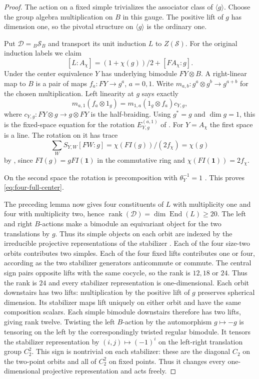 \documentclass[11pt,reqno]{amsart}
\theoremstyle{remark}\newtheorem{remark}[theorem]{Remark}
\numberwithin{equation}{section}
\begin{document}
\begin{proof}
The action on a fixed simple trivializes the associator class of
$\langle g\rangle$. Choose the group algebra multiplication on
$B$ in this gauge. The positive lift of $g$ has dimension one,
so the pivotal structure on $\langle g\rangle$ is the ordinary one.

Put $\mathcal D={}_B\mathcal S_B$ and transport its unit induction
$L$ to $Z(\mathcal S)$. For the original induction labels we claim
\begin{equation}\label{eq:four-full-center}
 [L:A_\chi]=(1+\chi(g))/2+[FA_\chi:g].
\end{equation}
Under the center equivalence $Y$ has underlying bimodule $FY\otimes B$.
A right-linear map to $B$ is a pair of maps $f_a:FY\to g^a$, $a=0,1$.
Write $m_{a,b}:g^a\otimes g^b\to g^{a+b}$ for the chosen multiplication.
Left linearity at $g$ says exactly
\[
 m_{a,1}(f_a\otimes1_g)=m_{1,a}(1_g\otimes f_a)c_{Y,g},
\]
where $c_{Y,g}:FY\otimes g\to g\otimes FY$ is the half-braiding.
Using $g^*=g$ and $\dim g=1$, this is the fixed-space equation
for the rotation $E^{(a,1)}_{Y,g}$ of \cite[Definition~2.4]{NgSchInd}.
For $Y=A_\chi$ the first space is a line. The rotation on it has trace
\[
 \sum_W S_{Y,W}[FW:g]=\chi(FI(g))/(2f_\chi)=\chi(g)
\]
by \cite[(5.4)]{NgSchInd}, since $FI(g)=gFI(\mathbf1)$
in the commutative ring and $\chi(FI(\mathbf1))=2f_\chi$.

On the second space the rotation is
precomposition with $\theta_Y^{-1}=1$
\cite[Lemma~2.7]{NgSchInd}. This proves \eqref{eq:four-full-center}.

The preceding lemma now gives four constituents of $L$ with
multiplicity one and four with multiplicity two, hence
$\operatorname{rank}(\mathcal D)=\dim\operatorname{End}(L)\ge20$.
The left and right $B$-actions make a bimodule an equivariant
object for the two translations by $g$. Thus its simple objects
on each orbit are indexed by the irreducible projective
representations of the stabilizer \cite[Corollary~2.13]{BN}.
Each of the four size-two orbits contributes two simples. Each of
the four fixed lifts contributes one or four, according as the two
stabilizer generators anticommute or commute. The central sign pairs
opposite lifts with the same cocycle, so the rank is $12,18$ or $24$.
Thus the rank is $24$ and every stabilizer representation is
one-dimensional. Each orbit downstairs has two lifts: multiplication
by the positive lift of $g$ preserves spherical dimension.
Its stabilizer maps lift uniquely on either orbit and have the same
composition scalars. Each simple bimodule downstairs therefore has
two lifts, giving rank twelve.
Twisting the left $B$-action by the automorphism $g\mapsto-g$
is tensoring on the left by the correspondingly twisted regular
bimodule. It tensors the stabilizer representation by
$(i,j)\mapsto(-1)^i$ on the left-right translation group $C_2^2$.
This sign is nontrivial on each stabilizer: these are the diagonal
$C_2$ on the two-point orbits and all of $C_2^2$ on fixed points.
Thus it changes every one-dimensional projective representation
and acts freely.


\end{proof}
\end{document}
